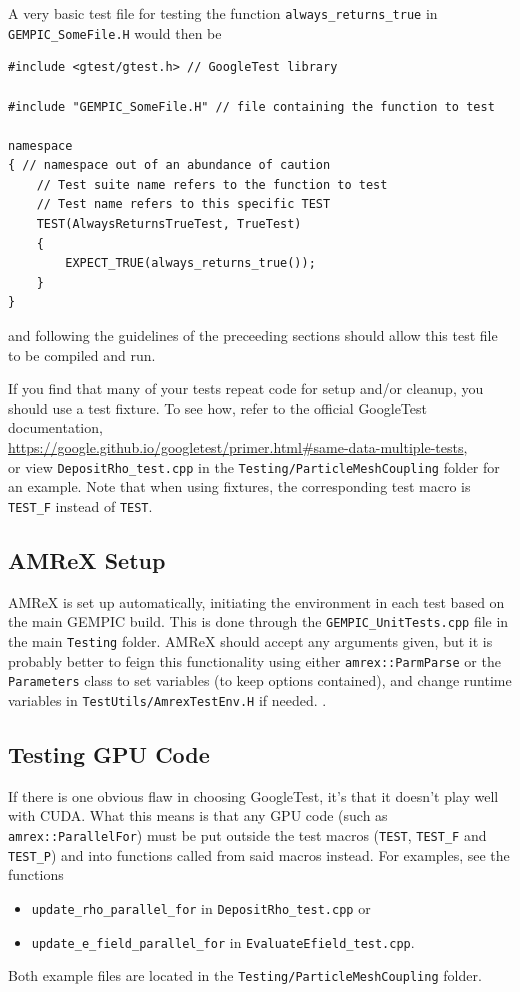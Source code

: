 \documentclass[11pt]{article}
\newcommand{\gt}{GoogleTest}
\newcommand{\pmc}{\texttt{Testing/ParticleMeshCoupling}}
\newcommand{\main}{main \texttt{Testing}}
\newcommand\loc[1]{in the #1 folder}
\begin{document}
 A very basic test file for testing the function \lstinline{always_returns_true} in \verb|GEMPIC_SomeFile.H| would then be
\begin{lstlisting}[emph={TEST,EXPECT_TRUE},emphstyle={\color{macrocolor}\bfseries}]
#include <gtest/gtest.h> // GoogleTest library

#include "GEMPIC_SomeFile.H" // file containing the function to test

namespace
{ // namespace out of an abundance of caution
    // Test suite name refers to the function to test
    // Test name refers to this specific TEST
    TEST(AlwaysReturnsTrueTest, TrueTest)
    {
        EXPECT_TRUE(always_returns_true());
    }
}
\end{lstlisting}
 and following the guidelines of the preceeding sections should allow this test file to be compiled and run.

 If you find that many of your tests repeat code for setup and/or cleanup, you should use a test fixture. To see how, refer to the official \gt{} documentation,
 \\\url{https://google.github.io/googletest/primer.html#same-data-multiple-tests},\\
 or view \verb|DepositRho_test.cpp| \loc{\pmc} for an example. Note that when using fixtures, the corresponding test macro is \lstinline{TEST_F} instead of \lstinline{TEST}.

\subsection{AMReX Setup}
AMReX is set up automatically, initiating the environment in each test based on the main GEMPIC build. This is done through the \verb|GEMPIC_UnitTests.cpp| file \loc{\main}.
AMReX should accept any arguments given, but it is probably better to feign this functionality using either \lstinline{amrex::ParmParse} or the \lstinline{Parameters} class to set variables (to keep options contained), and change runtime variables in \verb|TestUtils/AmrexTestEnv.H| if needed. \todo{Move golden file ctests to \gt{}?}.

\subsection{Testing GPU Code}\label{sec:testing-gpu-code}
If there is one obvious flaw in choosing \gt, it's that it doesn't play well with CUDA. What this means is that any GPU code (such as \lstinline{amrex::ParallelFor}) must be put outside the test macros (\lstinline{TEST}, \lstinline{TEST_F} and \lstinline{TEST_P}) and into functions called from said macros instead. For examples, see the functions
\begin{itemize} 
    \item \lstinline{update_rho_parallel_for} in \verb|DepositRho_test.cpp| or 
    \item \lstinline{update_e_field_parallel_for} in \verb|EvaluateEfield_test.cpp|.
\end{itemize}
Both example files are located \loc{\pmc}.
\end{document}
